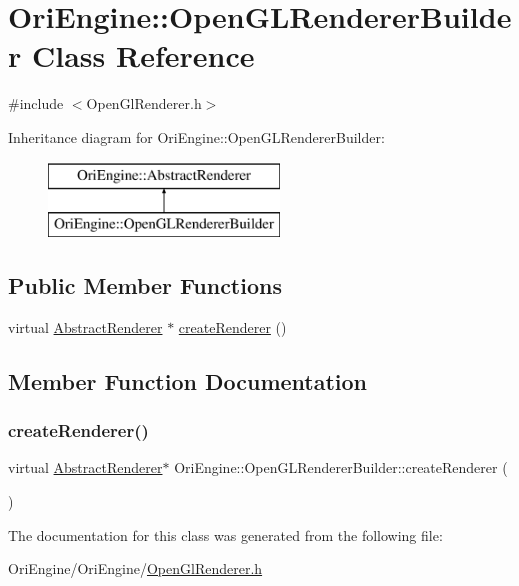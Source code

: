 \hypertarget{class_ori_engine_1_1_open_g_l_renderer_builder}{}\section{Ori\+Engine\+:\+:Open\+G\+L\+Renderer\+Builder Class Reference}
\label{class_ori_engine_1_1_open_g_l_renderer_builder}


{\ttfamily \#include $<$Open\+Gl\+Renderer.\+h$>$}

Inheritance diagram for Ori\+Engine\+:\+:Open\+G\+L\+Renderer\+Builder\+:\begin{figure}[H]
\begin{center}
\leavevmode
\includegraphics[height=2.000000cm]{class_ori_engine_1_1_open_g_l_renderer_builder}
\end{center}
\end{figure}
\subsection*{Public Member Functions}
\begin{DoxyCompactItemize}
\item 
virtual \hyperlink{class_ori_engine_1_1_abstract_renderer}{Abstract\+Renderer} $\ast$ \hyperlink{class_ori_engine_1_1_open_g_l_renderer_builder_a5ef23f8b0cb20f48117270819387bba9}{create\+Renderer} ()
\end{DoxyCompactItemize}


\subsection{Member Function Documentation}
\hypertarget{class_ori_engine_1_1_open_g_l_renderer_builder_a5ef23f8b0cb20f48117270819387bba9}{}\label{class_ori_engine_1_1_open_g_l_renderer_builder_a5ef23f8b0cb20f48117270819387bba9} 
\subsubsection{\texorpdfstring{create\+Renderer()}{createRenderer()}}
{\footnotesize\ttfamily virtual \hyperlink{class_ori_engine_1_1_abstract_renderer}{Abstract\+Renderer}$\ast$ Ori\+Engine\+::\+Open\+G\+L\+Renderer\+Builder\+::create\+Renderer (\begin{DoxyParamCaption}{ }\end{DoxyParamCaption})\hspace{0.3cm}{\ttfamily [virtual]}}



The documentation for this class was generated from the following file\+:\begin{DoxyCompactItemize}
\item 
Ori\+Engine/\+Ori\+Engine/\hyperlink{_open_gl_renderer_8h}{Open\+Gl\+Renderer.\+h}\end{DoxyCompactItemize}
